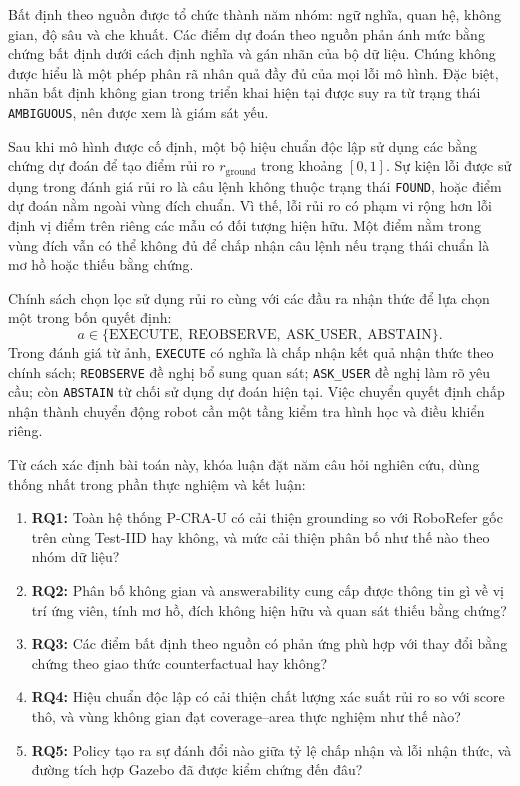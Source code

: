 Bất định theo nguồn được tổ chức thành năm nhóm: ngữ nghĩa, quan hệ, không gian, độ sâu và che khuất. Các điểm dự đoán theo nguồn phản ánh mức bằng chứng bất định dưới cách định nghĩa và gán nhãn của bộ dữ liệu. Chúng không được hiểu là một phép phân rã nhân quả đầy đủ của mọi lỗi mô hình. Đặc biệt, nhãn bất định không gian trong triển khai hiện tại được suy ra từ trạng thái \texttt{AMBIGUOUS}, nên được xem là giám sát yếu.

Sau khi mô hình được cố định, một bộ hiệu chuẩn độc lập sử dụng các bằng chứng dự đoán để tạo điểm rủi ro $r_{\mathrm{ground}}$ trong khoảng $[0,1]$. Sự kiện lỗi được sử dụng trong đánh giá rủi ro là câu lệnh không thuộc trạng thái \texttt{FOUND}, hoặc điểm dự đoán nằm ngoài vùng đích chuẩn. Vì thế, lỗi rủi ro có phạm vi rộng hơn lỗi định vị điểm trên riêng các mẫu có đối tượng hiện hữu. Một điểm nằm trong vùng đích vẫn có thể không đủ để chấp nhận câu lệnh nếu trạng thái chuẩn là mơ hồ hoặc thiếu bằng chứng.

Chính sách chọn lọc sử dụng rủi ro cùng với các đầu ra nhận thức để lựa chọn một trong bốn quyết định:
\[
    a \in \{\mathrm{EXECUTE},\ \mathrm{REOBSERVE},\
             \mathrm{ASK\_USER},\ \mathrm{ABSTAIN}\}.
\]
Trong đánh giá từ ảnh, \texttt{EXECUTE} có nghĩa là chấp nhận kết quả nhận thức theo chính sách; \texttt{REOBSERVE} đề nghị bổ sung quan sát; \texttt{ASK\_USER} đề nghị làm rõ yêu cầu; còn \texttt{ABSTAIN} từ chối sử dụng dự đoán hiện tại. Việc chuyển quyết định chấp nhận thành chuyển động robot cần một tầng kiểm tra hình học và điều khiển riêng.

Từ cách xác định bài toán này, khóa luận đặt năm câu hỏi nghiên cứu, dùng thống nhất trong phần thực nghiệm và kết luận:
\begin{enumerate}
    \item \textbf{RQ1:} Toàn hệ thống P-CRA-U có cải thiện grounding so với RoboRefer gốc trên cùng Test-IID hay không, và mức cải thiện phân bố như thế nào theo nhóm dữ liệu?
    \item \textbf{RQ2:} Phân bố không gian và answerability cung cấp được thông tin gì về vị trí ứng viên, tính mơ hồ, đích không hiện hữu và quan sát thiếu bằng chứng?
    \item \textbf{RQ3:} Các điểm bất định theo nguồn có phản ứng phù hợp với thay đổi bằng chứng theo giao thức counterfactual hay không?
    \item \textbf{RQ4:} Hiệu chuẩn độc lập có cải thiện chất lượng xác suất rủi ro so với score thô, và vùng không gian đạt coverage--area thực nghiệm như thế nào?
    \item \textbf{RQ5:} Policy tạo ra sự đánh đổi nào giữa tỷ lệ chấp nhận và lỗi nhận thức, và đường tích hợp Gazebo đã được kiểm chứng đến đâu?
\end{enumerate}

